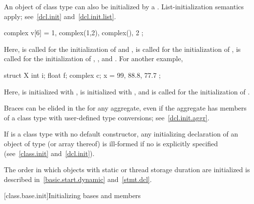 \pnum
{}%
%
An object of class type can also be initialized by a
. List-initialization semantics apply;
see~\ref{dcl.init} and~\ref{dcl.init.list}.
\begin{example}
\begin{codeblock}
complex v[6] = { 1, complex(1,2), complex(), 2 };
\end{codeblock}

Here,
is called for the initialization of
and
,
is called for the initialization of
,
is called for the initialization of
,
,
and
.
For another example,

\begin{codeblock}
struct X {
  int i;
  float f;
  complex c;
} x = { 99, 88.8, 77.7 };
\end{codeblock}

Here,
is initialized with ,
is initialized with , and
is called for the initialization of
.
\end{example}
\begin{note}
Braces can be elided in the
for any aggregate, even if the aggregate has members of a class type with
user-defined type conversions; see~\ref{dcl.init.aggr}.
\end{note}

\pnum
\begin{note}
If
is a class type with no default constructor,
any initializing declaration of an object of type
(or array thereof) is ill-formed if no
is explicitly specified (see~\ref{class.init} and~\ref{dcl.init}).
\end{note}

\pnum
\begin{note}
%
The order in which objects with static or thread storage duration
are initialized is described in~\ref{basic.start.dynamic} and~\ref{stmt.dcl}.
\end{note}

[class.base.init]{Initializing bases and members}%
%

